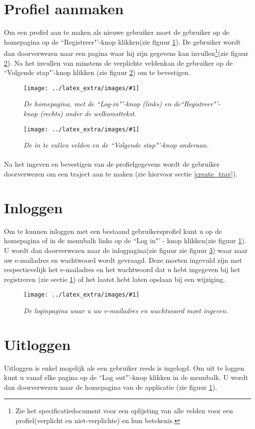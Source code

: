 \documentclass[11pt,twoside,a4paper]{report}
\newcommand*{\copyimageH}[4]{ 			%
	\begin{figure}[Ht]
	\texttt{[image: ../latex\_extra/images/\#1]}
	\caption{\textit{#4}}\label{#2}
	\end{figure}
}
\begin{document}
\section{Profiel aanmaken}\label{create_acc}
Om een profiel aan te maken als nieuwe gebruiker moet de gebruiker op de homepagina op de ``Registreer"'-knop klikken(zie figuur \ref{home_pge}). De gebruiker wordt dan doorverwezen naar een pagina waar hij zijn gegevens kan invullen\footnote{Zie het specificatiedocument voor een oplijsting van alle velden voor een profiel(verplicht en niet-verplichte) en hun betekenis.}(zie figuur \ref{reg_pge}). Na het invullen van minstens de verplichte velden\footnotemark[2] kan de gebruiker op de ``Volgende stap"'-knop klikken (zie figuur \ref{reg_pge}) om te bevestigen.
\copyimageH{home.jpg}{home_pge}{\textwidth}{De homepagina, met  de ``Log-in"'-knop (links) en de``Registreer"'-knop (rechts) onder de welkomsttekst.}
\copyimageH{reg_pge.jpg}{reg_pge}{\textwidth}{De in te vullen velden en de ``Volgende stap"'-knop onderaan.}
\paragraph{}Na het ingeven en bevestigen van de profielgegevens wordt de gebruiker doorverwezen om een traject aan te maken (zie hiervoor sectie \ref{create_trav}).
		
	\section{Inloggen}\label{log_in}
Om te kunnen inloggen met een bestaand gebruikersprofiel kunt u op de homepagina of in de menubalk links op de ``Log in"' - knop klikken(zie figuur \ref{home_pge}). U wordt dan doorverwezen naar de inlogpagina(zie figuur zie figuur \ref{login_pge}) waar naar uw e-mailadres en wachtwoord wordt gevraagd. Deze moeten ingevuld zijn met respectievelijk het e-mailadres en het wachtwoord dat u hebt ingegeven bij het registreren (zie sectie \ref{create_acc}) of het laatst hebt laten opslaan bij een wijziging.
\copyimageH{login.jpg}{login_pge}{\textwidth}{De loginpagina waar u uw e-mailadres en wachtwoord moet ingeven.}
	
	\section{Uitloggen}\label{log_out}
Uitloggen is enkel mogelijk als een gebruiker reeds is ingelogd. Om uit te loggen kunt u vanaf elke pagina op de ``Log out"'-knop klikken in de menubalk. U wordt dan doorverwezen naar de homepagina van de applicatie (zie figuur  \ref{home_pge}). 
\end{document}
